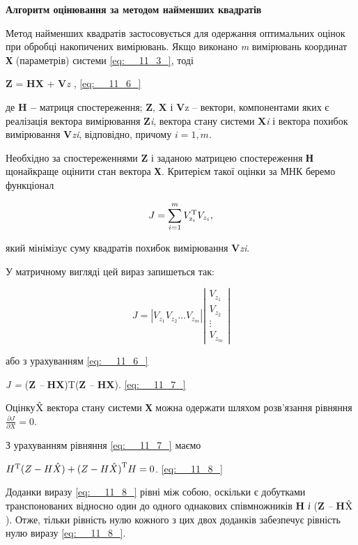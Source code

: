 \textbf{Алгоритм оцінювання за методом найменших квадратів}

Метод найменших квадратів застосовується для одержання оптимальних оцінок при обробці 
накопичених вимірювань. Якщо виконано \textit{m} вимірювань координат \textbf{Х}\textit{ }(параметрів) 
системи \eqref{eq:__11_3_}, тоді

\textbf{Z} = \textbf{HX }+ \textbf{V}\textit{z },\textit{                                             }\eqref{eq:__11_6_}

де \textbf{H -- }матриця 
спостереження; \textbf{Z}, \textbf{X} і \textbf{V}z  -- вектори, компонентами яких 
є реалізація вектора вимірювання \textbf{Z}\textit{i}, вектора стану системи \textbf{X}\textit{i }і 
вектора похибок вимірювання \textbf{V}\textit{zi}, відповідно, причому $i=\overline{1,m}$.$ $

Необхідно 
за спостереженнями \textbf{Z}  і заданою матрицею спостереження \textbf{Н} щонайкраще 
оцінити стан вектора \textbf{Х}\textit{.} Критерієм такої оцінки за МНК беремо функціонал    

\[J=
\sum _{i=1}^{m}V_{{\rm z}_{i} }^{{\rm T}}  V_{z_{i} } ,\] 

який  мінімізує  суму  квадратів  похибок  вимірювання   \textbf{V}\textit{zi}.

У матричному вигляді цей вираз запишеться так:

\[J=|V_{z_{1} } V_{z_{2} } \ldots V_{z_{m} } |\left|\begin{array}{c} {V_{z_{1} } 
} \\ {V_{z_{2} } } \\ {\vdots } \\ {V_{z_{m} } } \end{array}\right|\] 

або з урахуванням \eqref{eq:__11_6_} 

\textit{J = }(\textbf{Z}\textit{ -- }\textbf{HX})T(\textbf{Z}\textit{ -- }\textbf{HX}).\textit{                             }\eqref{eq:__11_7_}\textit{}

Оцінку$\hat{{
\rm X} }$  вектора стану системи \textbf{Х }можна одержати шляхом розв'язання  рівняння  $\frac{
\partial J}{\partial X} =0$.

З урахуванням рівняння \eqref{eq:__11_7_} маємо

$H^{{\rm T}} {\rm (}Z-H\hat{X}{\rm )}+{\rm (}Z-H\hat{X}{\rm )}^{{\rm T}} H={\rm 0}$.                 
\eqref{eq:__11_8_}

Доданки  виразу \eqref{eq:__11_8_} рівні між собою, оскільки є добутками транспонованих 
відносно один до одного однакових співмножників \textbf{H}\textit{ і }(\textbf{Z}\textit{ -- }\textbf{H}\textit{$\hat{{
\rm X} }$}). Отже, тільки рівність  нулю кожного з цих двох доданків забезпечує рівність 
нулю виразу \eqref{eq:__11_8_}.

